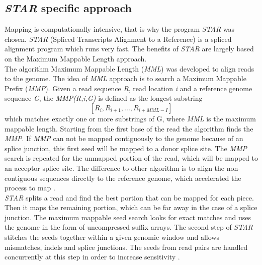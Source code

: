 \documentclass[12pt, a4paper]{report}
\begin{document}
\subsection{\textit{STAR} specific approach}
Mapping is computationally intensive, that is why the program \textit{STAR} was chosen. \textit{STAR} (Spliced Transcripts Alignment to a Reference) is a spliced alignment program which runs very fast. The benefits of \textit{STAR} are largely based on the Maximum Mappable Length approach. \\
The algorithm Maximum Mappable Length (\textit{MML}) was developed to align reads to the genome. The idea of \textit{MML} approach is to search a Maximum Mappable Prefix (\textit{MMP}). Given a read sequence \textit{R}, read location \textit{i} and a reference genome sequence \textit{G}, the \textit{MMP(R,i,G)} is defined as the longest substring  
\[
[R_{i} , R_{i+1} , ... , R_{i+MML-I} ]
\]
which matches exactly one or more substrings of G, where \textit{MML} is the maximum mappable length. 
Starting from the first base of the read the algorithm finds the \textit{MMP}. If \textit{MMP} can not be mapped contiguously to the genome because of an splice junction, this first seed will be mapped to a donor splice site. The \textit{MMP} search is repeated for the unmapped portion of the read, which will be mapped to an acceptor splice site.
The difference to other algorithm is to align the non-contiguous sequences directly to the reference genome, which accelerated the process to map \cite{Dobin2013}. \\
\textit{STAR} splits a read and find the best portion that can be mapped for each piece. Then it maps the remaining portion, which can be far away in the case of a splice junction. The maximum mappable seed search looks for exact matches and uses the genome in the form of uncompressed suffix arrays. The second step of \textit{STAR} stitches the seeds together within a given genomic window and allows mismatches, indels and splice junctions. The seeds from read pairs are handled concurrently at this step in order to increase sensitivity \cite{Dobin2013, Korpelainen2014}. 
\end{document}

